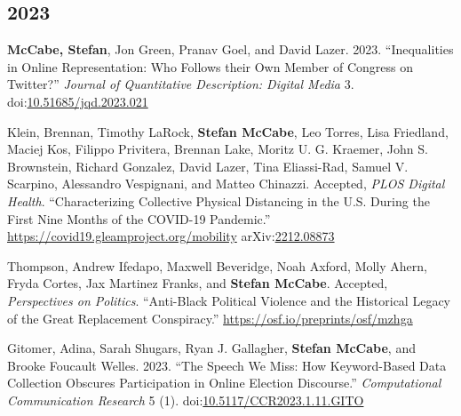 \documentclass[11pt, letter]{article}
\begin{document}
\subsection{2023}
\begin{hangparas}{.25in}{1}
\textbf{McCabe, Stefan}, Jon Green, Pranav Goel, and David Lazer. 2023. ``Inequalities in Online Representation: Who Follows their Own Member of Congress on Twitter?'' \textit{Journal of Quantitative Description: Digital Media} 3. doi:\href{https://doi.org/10.51685/jqd.2023.021}{10.51685/jqd.2023.021}\vspace{2mm}

Klein, Brennan,\textsuperscript{\textdagger} Timothy LaRock,\textsuperscript{\textdagger} \textbf{Stefan McCabe},\textsuperscript{\textdagger} Leo Torres,\textsuperscript{\textdagger} Lisa Friedland, Maciej Kos, Filippo Privitera, Brennan Lake, Moritz U. G. Kraemer, John S. Brownstein, Richard Gonzalez, David Lazer, Tina Eliassi-Rad, Samuel V. Scarpino, Alessandro Vespignani, and Matteo Chinazzi. Accepted, \textit{PLOS Digital Health}. ``Characterizing Collective Physical Distancing in the U.S. During the First Nine Months of the COVID-19 Pandemic.'' \href{https://covid19.gleamproject.org/mobility}{https://covid19.gleamproject.org/mobility} arXiv:\href{https://arxiv.org/abs/2212.08873}{2212.08873}\vspace{2mm}

Thompson, Andrew Ifedapo, Maxwell Beveridge, Noah Axford, Molly Ahern, Fryda Cortes, Jax Martinez Franks, and \textbf{Stefan McCabe}. Accepted, \textit{Perspectives on Politics}. ``Anti-Black Political Violence and the Historical Legacy of the Great Replacement Conspiracy.'' \href{https://osf.io/preprints/osf/mzhga}{https://osf.io/preprints/osf/mzhga}\vspace{2mm}

Gitomer, Adina, Sarah Shugars, Ryan J. Gallagher, \textbf{Stefan McCabe}, and Brooke Foucault Welles. 2023. ``The Speech We Miss: How Keyword-Based Data Collection Obscures Participation in Online Election Discourse.''  \textit{Computational Communication Research} 5 (1). doi:\href{https://doi.org/10.5117/CCR2023.1.11.GITO}{10.5117/CCR2023.1.11.GITO}\vspace{2mm}
\end{hangparas}
\end{document}
